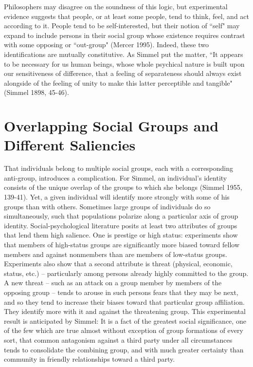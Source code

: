 \documentclass[12pt]{article}
\begin{document}
Philosophers may disagree on the soundness of this logic, but experimental evidence suggests that people, or at least some people, tend to think, feel, and act according to it.  People tend to be self-interested, but their notion of ``self" may expand to include persons in their social group whose existence requires contrast with some opposing or ``out-group" (Mercer 1995).  Indeed, these two identifications are mutually constitutive.  As Simmel put the matter, ``It appears to be necessary for us human beings, whose whole psychical nature is built upon our sensitiveness of difference, that a feeling of separateness should always exist alongside of the feeling of unity to make this latter perceptible and tangible" (Simmel 1898, 45-46).  

\section*{Overlapping Social Groups and Different Saliencies}
That individuals belong to multiple social groups, each with a corresponding anti-group, introduces a complication.  For Simmel, an individual's identity consists of the unique overlap of the groups to which she belongs (Simmel 1955, 139-41).  Yet, a given individual will identify more strongly with some of his groups than with others.  
Sometimes large groups of individuals do so simultaneously, such that populations polarize along a particular axis of group identity.   Social-psychological literature posits at least two attributes of groups that lend them high salience.  One is prestige or high status:  experiments show that members of high-status groups are significantly more biased toward fellow members and against nonmembers than are members of low-status groups.   Experiments also show that a second attribute is threat (physical, economic, status, etc.) – particularly among persons already highly committed to the group.  A new threat – such as an attack on a group member by members of the opposing group – tends to arouse in such persons fears that they may be next, and so they tend to increase their biases toward that particular group affiliation.  They identify more with it and against the threatening group.  This experimental result is anticipated by Simmel:
It is a fact of the greatest social significance, one of the few which are true almost without exception of group formations of every sort, that common antagonism against a third party under all circumstances tends to consolidate the combining group, and with much greater certainty than community in friendly relationships toward a third party. 
\end{document}
